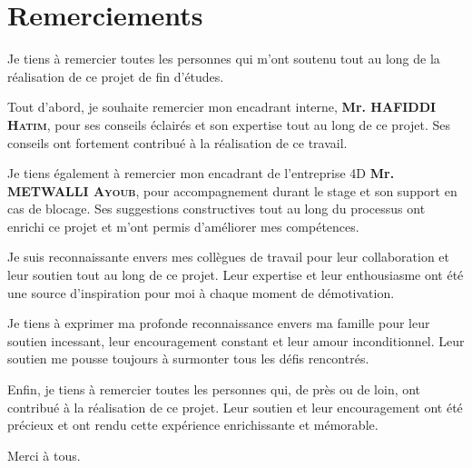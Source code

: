 \chapter*{Remerciements}

\begin{spacing}{1.25}

\hspace{0.6cm}Je tiens à remercier toutes les personnes qui m'ont soutenu tout au long de la réalisation de ce projet de fin d'études.
\newline

Tout d'abord, je souhaite remercier mon encadrant interne, \textbf{Mr. HAFIDDI \textsc{Hatim}}, pour ses conseils éclairés et son expertise tout au long de ce projet. Ses conseils ont fortement contribué à la réalisation de ce travail.
\newline

Je tiens également à remercier mon encadrant de l'entreprise 4D \textbf{Mr. METWALLI \textsc{Ayoub}}, pour accompagnement durant le stage et son support en cas de blocage. Ses suggestions constructives tout au long du processus ont enrichi ce projet et m'ont permis d'améliorer mes compétences.
\newline

Je suis reconnaissante envers mes collègues de travail pour leur collaboration et leur soutien tout au long de ce projet. Leur expertise et leur enthousiasme ont été une source d'inspiration pour moi à chaque moment de démotivation.
\newline

Je tiens à exprimer ma profonde reconnaissance envers ma famille pour leur soutien incessant, leur encouragement constant et leur amour inconditionnel. Leur soutien me pousse toujours à surmonter tous les défis rencontrés.
\newline

Enfin, je tiens à remercier toutes les personnes qui, de près ou de loin, ont contribué à la réalisation de ce projet. Leur soutien et leur encouragement ont été précieux et ont rendu cette expérience enrichissante et mémorable.
\newline

Merci à tous.

\end{spacing}